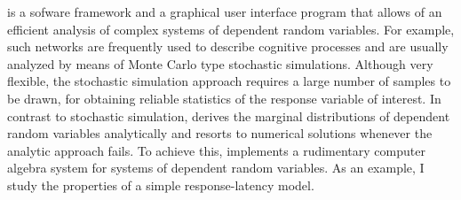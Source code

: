  is a sofware framework and a graphical user interface program that allows of an efficient
analysis of complex systems of dependent random variables. For example, such networks are 
frequently used to describe cognitive processes and are usually analyzed by means of Monte Carlo
type stochastic simulations. Although very flexible, the stochastic simulation approach requires a
large number of samples to be drawn, for obtaining reliable statistics of the response variable of
interest. In contrast to stochastic simulation,  derives the marginal distributions of
dependent random variables analytically and resorts to numerical solutions whenever the analytic
approach fails. To achieve this,   implements a rudimentary computer algebra system
for systems of dependent random variables. As an example, I study the properties of a simple 
response-latency model.
